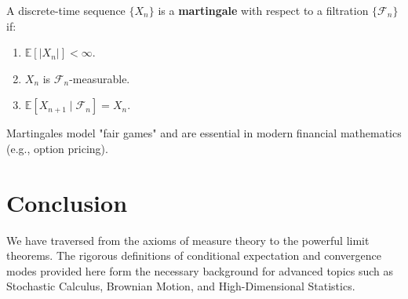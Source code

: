 \begin{definition}[Martingale]
A discrete-time sequence $\{X_n\}$ is a \textbf{martingale} with respect to a filtration $\{\mathcal{F}_n\}$ if:
\begin{enumerate}
    \item $\mathbb{E}[|X_n|] < \infty$.
    \item $X_n$ is $\mathcal{F}_n$-measurable.
    \item $\mathbb{E}[X_{n+1} \mid \mathcal{F}_n] = X_n$.
\end{enumerate}
Martingales model "fair games" and are essential in modern financial mathematics (e.g., option pricing).
\end{definition}

\section{Conclusion}
We have traversed from the axioms of measure theory to the powerful limit theorems. The rigorous definitions of conditional expectation and convergence modes provided here form the necessary background for advanced topics such as Stochastic Calculus, Brownian Motion, and High-Dimensional Statistics.

